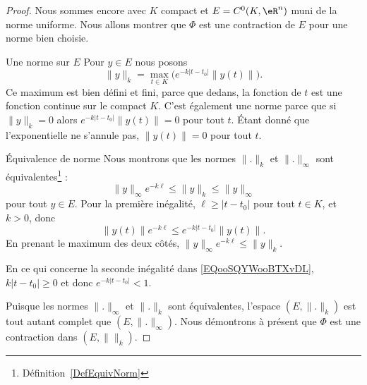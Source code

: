 \begin{proof}
	Nous sommes encore avec \( K\) compact et \( E=C^0(K,\eR^n)\) muni de la norme uniforme. Nous allons montrer que \( \Phi\) est une contraction de \( E\) pour une norme bien choisie.

	\begin{subproof}
		\item[Une norme sur \( E\)]
		Pour \( y\in E\) nous posons
		\begin{equation}
			\| y \|_k=\max_{t\in K}\big(  e^{-k| t-t_0 |}\| y(t) \| \big).
		\end{equation}
		Ce maximum est bien défini et fini, parce que dedans, la fonction de \( t\) est une fonction continue sur le compact \( K\). C'est également une norme parce que si \( \| y \|_k=0\) alors \(  e^{-k| t-t_0 |}\| y(t) \|=0\) pour tout \( t\). Étant donné que l'exponentielle ne s'annule pas, \( \| y(t) \|=0\) pour tout \( t\).
		\item[Équivalence de norme]
		Nous montrons que les normes \( \| . \|_k\) et \( \| . \|_{\infty}\) sont équivalentes\footnote{Définition~\ref{DefEquivNorm}} :
		\begin{equation}        \label{EQooSQYWooBTXvDL}
			\| y \|_{\infty} e^{-k\ell}\leq \| y \|_k\leq \| y \|_{\infty}
		\end{equation}
		pour tout \( y\in E\). Pour la première inégalité, \( \ell\geq | t-t_0 |\) pour tout \( t\in K\), et \( k>0\), donc
		\begin{equation}
			\| y(t) \| e^{-k\ell}\leq  e^{-k| t-t_0 |}\| y(t) \|.
		\end{equation}
		En prenant le maximum des deux côtés, \( \| y \|_{\infty} e^{-k\ell}\leq \| y \|_k\).

		En ce qui concerne la seconde inégalité dans \eqref{EQooSQYWooBTXvDL}, \( k| t-t_0 |\geq 0\) et donc \(  e^{-k| t-t_0 |}<1\).

	\end{subproof}
	Puisque les normes \( \| . \|_{\infty}\) et \( \| . \|_k\) sont équivalentes, l'espace \( (E,\| . \|_k)\) est tout autant complet que \( (E,\| . \|_{\infty})\). Nous démontrons à présent que \( \Phi\) est une contraction dans \( (E,\|  \|_k)\).


\end{proof}
